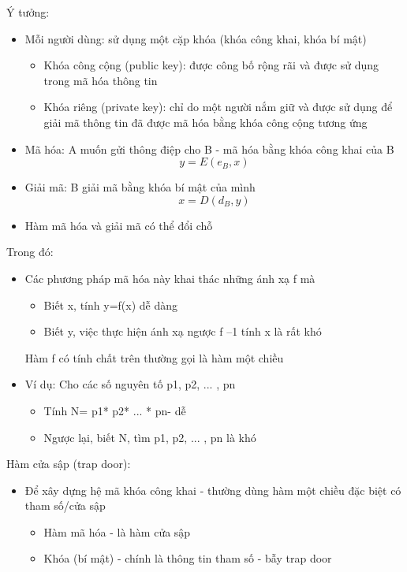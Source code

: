 \documentclass{article}
\begin{document}
Ý tưởng:
\begin{itemize}
    \item Mỗi người dùng: sử dụng một cặp khóa (khóa công khai, khóa bí mật)
          \begin{itemize}
              \item  Khóa công cộng (public key): được công bố rộng rãi và được sử dụng trong mã hóa thông tin
              \item  Khóa riêng (private key): chỉ do một người nắm giữ và được sử dụng để giải mã thông tin đã được mã hóa bằng khóa công cộng tương ứng
          \end{itemize}

    \item Mã hóa: A muốn gửi thông điệp cho B - mã hóa bằng khóa công khai của B
          $$y = E(e_B, x)$$

    \item Giải mã: B giải mã bằng khóa bí mật của mình
          $$x = D(d_B, y)$$

    \item Hàm mã hóa và giải mã có thể đổi chỗ
\end{itemize}

Trong đó:
\begin{itemize}
    \item  Các phương pháp mã hóa này khai thác những ánh xạ f mà
          \begin{itemize}
              \item  Biết x, tính y=f(x) dễ dàng
              \item   Biết y, việc thực hiện ánh xạ ngược f –1 tính x là rất khó
          \end{itemize}
          Hàm f có tính chất trên thường gọi là hàm một chiều
    \item   Ví dụ: Cho các số nguyên tố p1, p2, ... , pn
          \begin{itemize}
              \item   Tính N= p1* p2* ... * pn- dễ
              \item    Ngược lại, biết N, tìm p1, p2, ... , pn là khó
          \end{itemize}
\end{itemize}


Hàm cửa sập (trap door):
\begin{itemize}
    \item  Để xây dựng hệ mã khóa công khai - thường dùng hàm một chiều đặc biệt có tham số/cửa sập
          \begin{itemize}
              \item  Hàm mã hóa - là hàm cửa sập
              \item  Khóa (bí mật) - chính là thông tin tham số - bẫy trap door
          \end{itemize}
\end{itemize}
\end{document}
